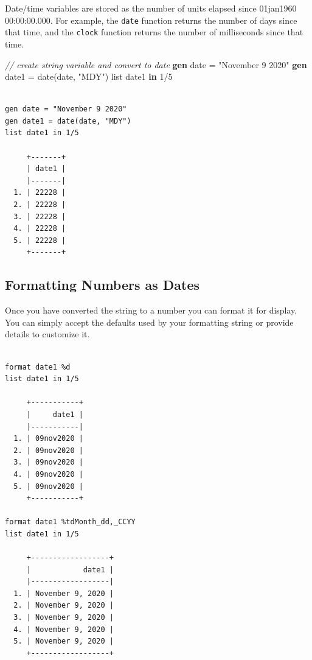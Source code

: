 \documentclass[]{book}
\newenvironment{Shaded}{\begin{snugshade}}{\end{snugshade}}
\newcommand{\CommentTok}[1]{\textcolor[rgb]{0.56,0.35,0.01}{\textit{#1}}}
\newcommand{\FunctionTok}[1]{\textcolor[rgb]{0.00,0.00,0.00}{#1}}
\newcommand{\KeywordTok}[1]{\textcolor[rgb]{0.13,0.29,0.53}{\textbf{#1}}}
\newcommand{\NormalTok}[1]{#1}
\newcommand{\OtherTok}[1]{\textcolor[rgb]{0.56,0.35,0.01}{#1}}
\newcommand{\StringTok}[1]{\textcolor[rgb]{0.31,0.60,0.02}{#1}}
\begin{document}
Date/time variables are stored as the number of units elapsed since 01jan1960 00:00:00.000. For example, the \texttt{date} function returns the number of days since that time, and the \texttt{clock} function returns the number of milliseconds since that time.

\begin{Shaded}
\begin{Highlighting}[]
  \CommentTok{// create string variable and convert to date}
  \KeywordTok{gen} \FunctionTok{date}\NormalTok{ = }\StringTok{"November 9 2020"}
  \KeywordTok{gen}\NormalTok{ date1 = }\FunctionTok{date}\NormalTok{(}\FunctionTok{date}\NormalTok{, }\StringTok{"MDY"}\NormalTok{)}
  \OtherTok{list}\NormalTok{ date1 }\KeywordTok{in}\NormalTok{ 1/5}
\end{Highlighting}
\end{Shaded}

\begin{verbatim}

gen date = "November 9 2020"
gen date1 = date(date, "MDY")
list date1 in 1/5

     +-------+
     | date1 |
     |-------|
  1. | 22228 |
  2. | 22228 |
  3. | 22228 |
  4. | 22228 |
  5. | 22228 |
     +-------+
\end{verbatim}

\hypertarget{formatting-numbers-as-dates}{%
\subsection{Formatting Numbers as Dates}\label{formatting-numbers-as-dates}}

Once you have converted the string to a number you can format it for display. You can simply accept the defaults used by your formatting string or provide details to customize it.

\begin{Shaded}
\end{Shaded}

\begin{verbatim}

format date1 %d
list date1 in 1/5

     +-----------+
     |     date1 |
     |-----------|
  1. | 09nov2020 |
  2. | 09nov2020 |
  3. | 09nov2020 |
  4. | 09nov2020 |
  5. | 09nov2020 |
     +-----------+

format date1 %tdMonth_dd,_CCYY
list date1 in 1/5

     +------------------+
     |            date1 |
     |------------------|
  1. | November 9, 2020 |
  2. | November 9, 2020 |
  3. | November 9, 2020 |
  4. | November 9, 2020 |
  5. | November 9, 2020 |
     +------------------+
\end{verbatim}
\end{document}
